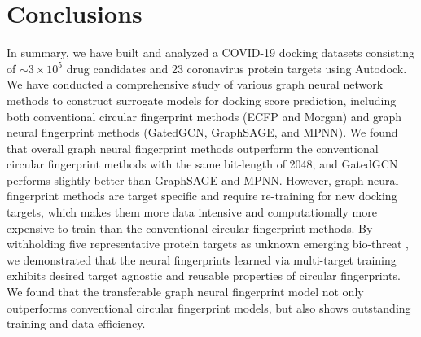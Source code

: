 \documentclass[conference]{IEEEtran}
\begin{document}
\section{Conclusions}
In summary, we have built and analyzed a COVID-19 docking datasets consisting of $\sim 3\times 10^5$ drug candidates and 23 coronavirus protein targets using Autodock.
We have conducted a comprehensive study of various graph neural network methods to construct surrogate models for  docking score prediction, including both conventional circular fingerprint methods (ECFP and Morgan) and graph neural fingerprint methods (GatedGCN, GraphSAGE, and MPNN). 
We found that overall graph neural fingerprint methods outperform the conventional circular fingerprint methods with the same bit-length of 2048, and GatedGCN performs slightly better than GraphSAGE and MPNN. 
However, graph neural fingerprint methods are target specific and require re-training for new docking targets, which makes them more data intensive and computationally more expensive to train than the conventional circular fingerprint methods. By withholding five representative protein targets as unknown emerging bio-threat , we demonstrated that the  neural fingerprints learned via multi-target training exhibits desired target agnostic and reusable properties of circular fingerprints.
We found that the transferable graph neural fingerprint model not only outperforms  conventional circular fingerprint models, but also shows outstanding training and data efficiency.





% 




\end{document}
